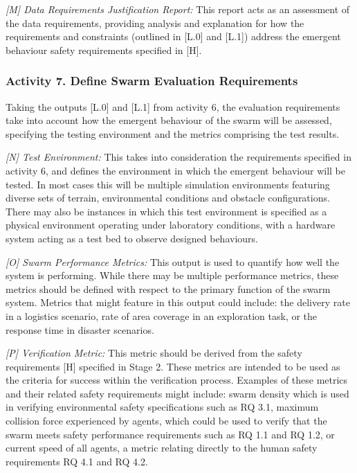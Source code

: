 \documentclass[runningheads]{llncs}
\begin{document}
\emph{[M] Data Requirements Justification Report:}
This report acts as an assessment of the data requirements, providing analysis and explanation for how the requirements and constraints (outlined in [L.0] and [L.1]) address the emergent behaviour safety requirements specified in [H].

\vspace{-2ex}
\subsubsection*{Activity 7. Define Swarm Evaluation Requirements}

Taking the outputs [L.0] and [L.1] from activity 6, the evaluation requirements take into account how the emergent behaviour of the swarm will be assessed, specifying the testing environment and the metrics comprising the test results.  


\emph{[N] Test Environment:} This takes into consideration the requirements specified in activity 6, and defines the environment in which the emergent behaviour will be tested. In most cases this will be multiple simulation environments featuring diverse sets of terrain, environmental conditions and obstacle configurations. There may also be instances in which this test environment is specified as a physical environment operating under laboratory conditions, with a hardware system acting as a test bed to observe designed behaviours.

\emph{[O] Swarm Performance Metrics:} This output is used to quantify how well the system is performing. While there may be multiple performance metrics, these metrics should be defined with respect to the primary function of the swarm system. Metrics that might feature in this output could include: the delivery rate in a logistics scenario, rate of area coverage in an exploration task, or the response time in disaster scenarios.

\emph{[P] Verification Metric:} This metric should be derived from the safety requirements [H] specified in Stage 2. These metrics are intended to be used as the criteria for success within the verification process. Examples of these metrics and their related safety requirements might include: swarm density which is used in verifying environmental safety specifications such as RQ 3.1, maximum collision force experienced by agents, which could be used to verify that the swarm meets safety performance requirements such as RQ 1.1 and RQ 1.2, or current speed of all agents, a metric relating directly to the human safety requirements RQ 4.1 and RQ 4.2.
\end{document}
